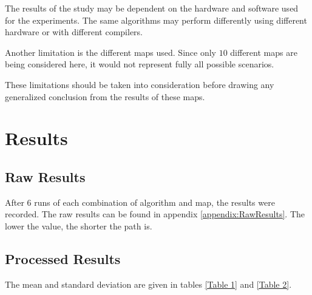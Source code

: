 \documentclass{article}
\begin{document}
\noindent
The results of the study may be dependent on the hardware and software used for the experiments. The same algorithms may perform differently using different hardware or with different compilers.

\noindent
Another limitation is the different maps used. Since only $10$ different maps are being considered here, it would not represent fully all possible scenarios. 

\noindent
These limitations should be taken into consideration before drawing any generalized conclusion from the results of these maps.


\section{Results}\label{Results}
\subsection{Raw Results}
After 6 runs of each combination of algorithm and map, the results were recorded. The raw results can be found in appendix \ref{appendix:RawResults}. The lower the value, the shorter the path is.


\subsection{Processed Results}

The mean and standard deviation are given in tables \ref{Table 1} and \ref{Table 2}.
\end{document}
